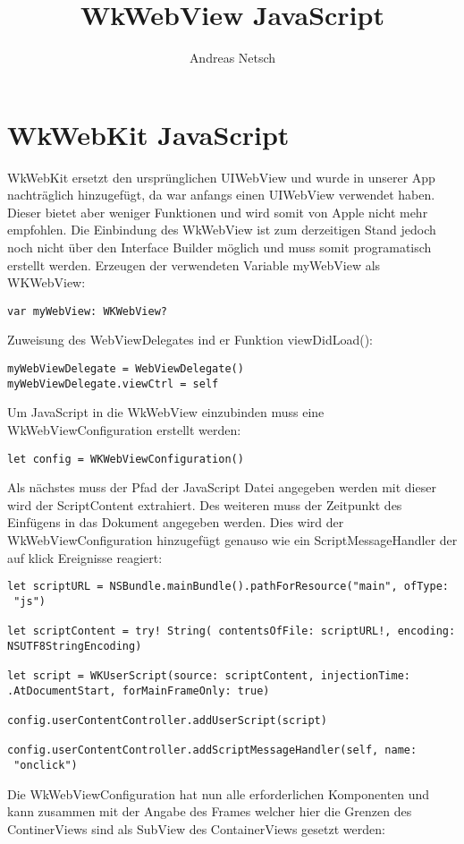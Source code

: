 
\title{WkWebView JavaScript}
\author{Andreas Netsch}



\chapter{ WkWebKit JavaScript}

WkWebKit ersetzt den ursprünglichen UIWebView und wurde in unserer App nachträglich hinzugefügt, da war anfangs einen UIWebView verwendet haben. Dieser bietet aber weniger Funktionen und wird somit von Apple nicht mehr empfohlen. Die Einbindung des WkWebView ist zum derzeitigen Stand jedoch noch nicht über den Interface Builder möglich und muss somit programatisch erstellt werden.
Erzeugen der verwendeten Variable myWebView als WKWebView:
\begin{verbatim}
var myWebView: WKWebView?
\end{verbatim}
Zuweisung des WebViewDelegates ind er Funktion viewDidLoad():
\begin{verbatim}
myWebViewDelegate = WebViewDelegate()
myWebViewDelegate.viewCtrl = self
\end{verbatim}
Um JavaScript in die WkWebView einzubinden muss eine WkWebViewConfiguration erstellt werden:
\begin{verbatim}
let config = WKWebViewConfiguration()
\end{verbatim}
Als nächstes muss der Pfad der JavaScript Datei angegeben werden mit dieser wird der ScriptContent extrahiert. Des weiteren muss der Zeitpunkt des Einfügens in das Dokument angegeben werden. Dies wird der WkWebViewConfiguration hinzugefügt genauso wie ein ScriptMessageHandler der auf klick Ereignisse reagiert:
\begin{verbatim}
let scriptURL = NSBundle.mainBundle().pathForResource("main", ofType:
 "js")
 
let scriptContent = try! String( contentsOfFile: scriptURL!, encoding:
NSUTF8StringEncoding)

let script = WKUserScript(source: scriptContent, injectionTime: 
.AtDocumentStart, forMainFrameOnly: true)

config.userContentController.addUserScript(script)
        
config.userContentController.addScriptMessageHandler(self, name:
 "onclick")
\end{verbatim}
Die WkWebViewConfiguration hat nun alle erforderlichen Komponenten und kann zusammen mit der Angabe des Frames welcher hier die Grenzen des ContinerViews sind als SubView des ContainerViews gesetzt werden:
